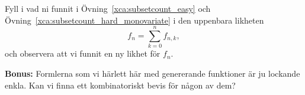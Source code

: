 \documentclass[nobib]{tufte-handout}
\begin{document}
\begin{xca}\label{xca:subsetcount_assemble}
    Fyll i vad ni funnit i Övning~\ref{xca:subsetcount_easy} och Övning~\ref{xca:subsetcount_hard_monovariate} i den uppenbara likheten
    $$f_n = \sum_{k=0}^{n} f_{n,k},$$
    och observera att vi funnit en ny likhet för $f_n$.
\end{xca}

\noindent\textbf{Bonus:} Formlerna som vi härlett här med genererande funktioner är ju lockande enkla. Kan vi finna ett kombinatoriskt bevis för någon av dem?

%
%
\end{document}

